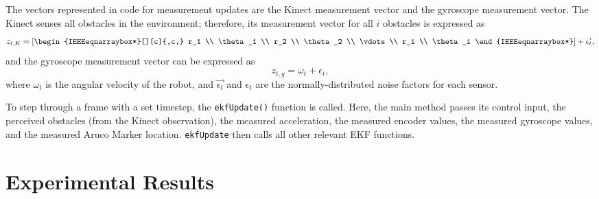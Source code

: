 \documentclass[journal]{IEEEtran}
\begin{document}
 The vectors represented
in code for measurement updates are the Kinect measurement vector and the gyroscope measurement vector.
The Kinect senses all obstacles in the environment; therefore, its measurement vector for all $i$ obstacles 
is expressed as
\begin{equation*}
 z_{t,K} = \left[\begin{IEEEeqnarraybox*}[][c]{,c,}
           r_1 \\
           \theta_1 \\
           r_2 \\
           \theta_2 \\
           \vdots \\
           r_i \\
           \theta_i
           \end{IEEEeqnarraybox*}\right] + \vec{\epsilon_t},
\end{equation*}
and the gyroscope measurement vector can be expressed as 
\begin{equation*}
 z_{t,g} = \omega_t + \epsilon_t,
\end{equation*}
where $\omega_t$ is the angular velocity of the robot, and $\vec{\epsilon_t}$ and $\epsilon_t$ are the 
normally-distributed noise factors for each sensor.

To step through a frame with a set timestep, the \texttt{ekfUpdate()} function is called. Here, the main 
method passes its control input, the perceived obstacles (from the Kinect observation), the measured 
acceleration, the measured encoder values, the measured gyroscope values, and the measured Aruco 
Marker location. \texttt{ekfUpdate} then calls all other relevant EKF functions. 



\section{Experimental Results}
\end{document}
